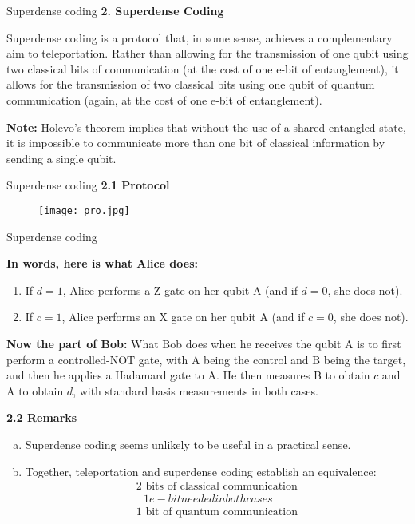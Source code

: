 \documentclass[12pt, aspectratio=169]{beamer}
\begin{document}
\begin{frame}{Superdense coding}
\textbf{2. Superdense Coding}

Superdense coding is a protocol that, in some sense, achieves a complementary aim to teleportation. Rather than allowing for the transmission of one qubit using two classical bits of communication (at the cost of one e-bit of entanglement), it allows for the transmission of two classical bits using one qubit of quantum communication (again, at the cost of one e-bit of entanglement).

\textbf{Note:} Holevo's theorem implies that without the use of a shared entangled state, it is impossible to communicate more than one bit of classical information by sending a single qubit.
\end{frame}
\begin{frame}{Superdense coding}
\textbf{2.1 Protocol}
\begin{figure}[h]
    \centering
    \texttt{[image: pro.jpg]}
   
\end{figure}
\end{frame}
\begin{frame}{Superdense coding}    


\textbf{In words, here is what Alice does:}
\begin{enumerate}
    \item If $d=1$, Alice performs a Z gate on her qubit A (and if $d=0$, she does not).
    \item If $c=1$, Alice performs an X gate on her qubit A (and if $c=0$, she does not).
\end{enumerate}

\textbf{Now the part of Bob:}
What Bob does when he receives the qubit A is to first perform a controlled-NOT gate, with A being the control and B being the target, and then he applies a Hadamard gate to A. He then measures B to obtain $c$ and A to obtain $d$, with standard basis measurements in both cases.

\textbf{2.2 Remarks}
\begin{enumerate}[a)]
    \item Superdense coding seems unlikely to be useful in a practical sense.
    \item Together, teleportation and superdense coding establish an equivalence:
    \[
    \begin{array}{c}
        \text{2 bits of classical communication} \\
        \hline
        \text{\ \ \ }1 e-bit needed in both cases\ \ \ \ \\
        \hline
        \text{1 bit of quantum communication}
    \end{array}
    \]
\end{enumerate}


\end{frame}
\end{document}
